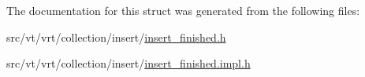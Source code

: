 The documentation for this struct was generated from the following files\+:\begin{DoxyCompactItemize}
\item 
src/vt/vrt/collection/insert/\hyperlink{insert__finished_8h}{insert\+\_\+finished.\+h}\item 
src/vt/vrt/collection/insert/\hyperlink{insert__finished_8impl_8h}{insert\+\_\+finished.\+impl.\+h}\end{DoxyCompactItemize}
